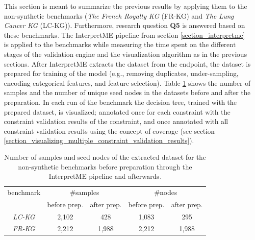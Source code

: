 This section is meant to summarize the previous results by applying them to the non-synthetic benchmarks (\textit{The French Royalty KG} (FR-KG) and \textit{The Lung Cancer KG} (LC-KG)). Furthermore, research question \textbf{Q5} is answered based on these benchmarks. The InterpretME pipeline from section \ref{section_interpretme} is applied to the benchmarks while measuring the time spent on the different stages of the validation engine and the visualization algorithm as in the previous sections. After InterpretME extracts the dataset from the endpoint, the dataset is prepared for training of the model (e.g., removing duplicates, under-sampling, encoding categorical features, and feature selection). Table \ref{tab:samples_nodes} shows the number of samples and the number of unique seed nodes in the datasets before and after the preparation. In each run of the benchmark the decision tree, trained with the prepared dataset, is visualized; annotated once for each constraint with the constraint validation results of the constraint, and once annotated with all constraint validation results using the concept of coverage (see section \ref{section_visualizing_multiple_constraint_validation_results}). 

\begin{table}
    \centering
    \begin{tabular}{c|cccc}
        \toprule
        benchmark & \multicolumn{2}{c}{\#samples} & \multicolumn{2}{c}{\#nodes}\\
        & before prep. & after prep. & before prep. & after prep.\\
        \midrule
        \midrule
        \textit{LC-KG} & 2,102 & 428  &  1,083 & 295 \\
        \textit{FR-KG} & 2,212 & 1,988 & 2,212 & 1,988 \\
        \bottomrule
    \end{tabular}
    \caption{Number of samples and seed nodes of the extracted dataset for the non-synthetic benchmarks before preparation through the InterpretME pipeline and afterwards.}
    \label{tab:samples_nodes}
\end{table}

